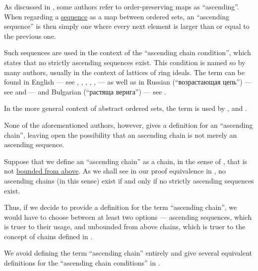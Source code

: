 \begin{remark}\label{rem:ascending_chains}
  As discussed in , some authors refer to order-preserving maps as \enquote{ascending}. When regarding a \hyperref[def:sequence]{sequence} as a map between ordered sets, an \enquote{ascending sequence} is then simply one where every next element is larger than or equal to the previous one.

  Such sequences are used in the context of the \enquote{ascending chain condition}, which states that no strictly ascending sequences exist. This condition is named so by many authors, usually in the context of lattices of ring ideals. The term can be found in English --- see , , , , ,  --- as well as in Russian (\enquote{возрастающая цепь}) --- see  and  --- and Bulgarian (\enquote{растяща верига}) --- see .

  In the more general context of abstract ordered sets, the term is used by ,  and .

  None of the aforementioned authors, however, gives a definition for an \enquote{ascending chain}, leaving open the possibility that an ascending chain is not merely an ascending sequence.

  Suppose that we define an \enquote{ascending chain} as a chain, in the sense of , that is not \hyperref[def:extremal_points/bounds]{bounded from above}. As we shall see in our proof equivalence in , no ascending chains (in this sense) exist if and only if no strictly ascending sequences exist.

  Thus, if we decide to provide a definition for the term \enquote{ascending chain}, we would have to choose between at least two options --- ascending sequences, which is truer to their usage, and unbounded from above chains, which is truer to the concept of chains defined in .

  We avoid defining the term \enquote{ascending chain} entirely and give several equivalent definitions for the \enquote{ascending chain conditions} in .
\end{remark}

